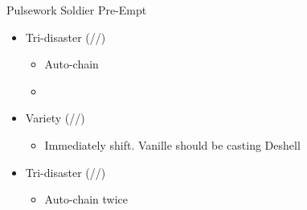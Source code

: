 \renewcommand{\first}{[1] Tri-disaster (\rav/\rav/\rav)}
\renewcommand{\fourth}{[4] Variety (\rav/\sab/\med)}

\begin{battle}{Pulsework Soldier Pre-Empt}
\begin{itemize}
    \item \first
    \begin{itemize}
        \item Auto-chain
        \item \stagger
    \end{itemize}
    \item \fourth
    \begin{itemize}
        \item Immediately shift. Vanille should be casting Deshell
    \end{itemize}
    \item \first
    \begin{itemize}
        \item Auto-chain twice
    \end{itemize}
\end{itemize}
\end{battle}


